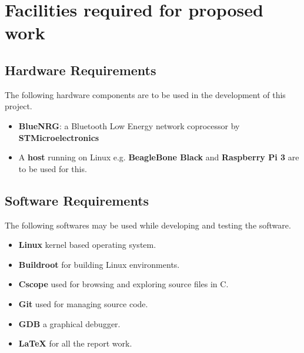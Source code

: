 \chapter{Facilities required for proposed work}
\section{Hardware Requirements}
The following hardware components are to be used in the development of this project.
\begin{itemize}
	\item \textbf{BlueNRG}: a Bluetooth Low Energy network coprocessor by \textbf{STMicroelectronics}
	\item A \textbf{host} running on Linux e.g. \textbf{BeagleBone Black} and \textbf{Raspberry Pi 3} are to be used for this.
\end{itemize}
\section{Software Requirements}
The following softwares may be used while developing and testing the software.
\begin{itemize}
	\item \textbf{Linux} kernel based operating system.
	\item \textbf{Buildroot} for building Linux environments.
	\item \textbf{Cscope} used for browsing and exploring source files in C.
	\item \textbf{Git} used for managing source code.
	\item \textbf{GDB} a graphical debugger.
	\item \textbf{\LaTeX}  for all the report work.
\end{itemize}
